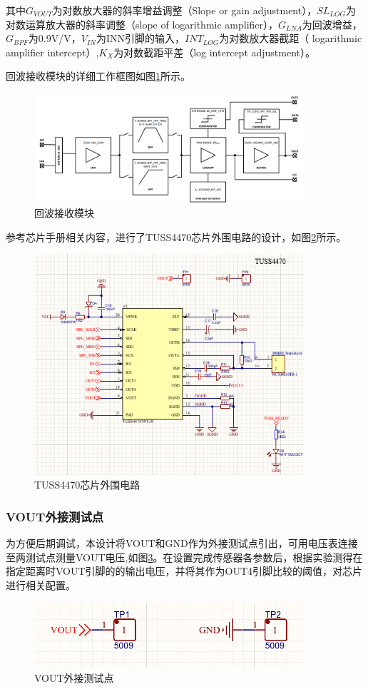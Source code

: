         其中$G_{VOUT}$为对数放大器的斜率增益调整（Slope or gain adjustment），$SL_{LOG}$为对数运算放大器的斜率调整（slope of logarithmic amplifier），$G_{LNA}$为回波增益，$G_{BPF}$为0.9V/V，$V_{IN}$为INN引脚的输入，$INT_{LOG}$为对数放大器截距（ logarithmic amplifier intercept）,$K_X$为对数截距平差（log intercept adjustment）。\par
    回波接收模块的详细工作框图如图\ref{回波接收模块}所示。
    \begin{figure}[ht]
        \centering
        \includegraphics[width=10cm]{figure/Analog Front-End Block Diagram.png}
        \caption{回波接收模块}
        \label{回波接收模块}
    \end{figure}
    参考芯片手册相关内容，进行了TUSS4470芯片外围电路的设计，如图\ref{TUSS4470芯片外围电路}所示。
    \begin{figure}[ht]
        \centering
        \includegraphics[width=10cm]{figure/TUSS4470 peripheral circuit.png}
        \caption{TUSS4470芯片外围电路}
        \label{TUSS4470芯片外围电路}
    \end{figure}
    \subsubsection{VOUT外接测试点}
    为方便后期调试，本设计将VOUT和GND作为外接测试点引出，可用电压表连接至两测试点测量VOUT电压,如图\ref{VOUT引脚}。在设置完成传感器各参数后，根据实验测得在指定距离时VOUT引脚的的输出电压，并将其作为OUT4引脚比较的阈值，对芯片进行相关配置。
    \begin{figure}[ht]
    	\centering
    	\includegraphics[width=10cm]{figure/vout pin.png}
    	\caption{VOUT外接测试点}
    	\label{VOUT引脚}
    \end{figure}
